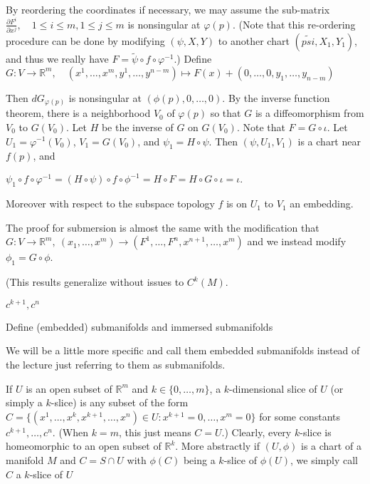 By reordering the coordinates if necessary, we may assume the sub-matrix
\(\frac{\partial F^i}{\partial x^j}, \quad 1 \leq i \leq m, 1 \leq j \leq m\)
is nonsingular at \(\varphi(p)\). (Note that this re-ordering procedure can be done by modifying \((\psi, X, Y)\) to another chart \((\tilde{psi}, X_1, Y_1)\), and thus we really have \(F = \tilde{\psi} \circ f \circ \varphi^{-1}\).) Define
\(G : V \to \mathbb{R}^m, \quad (x^1, \dots, x^m, y^1, \dots, y^{n-m}) \mapsto F(x) + (0, \dots, 0, y_1, \dots, y_{n-m})\)

Then \(dG_{\varphi(p)}\) is nonsingular at \( (\phi(p), 0, \dots, 0) \). By the inverse function theorem, there is a neighborhood \(V_0\) of \(\varphi(p)\) so that \(G\) is a diffeomorphism from \(V_0\) to \(G(V_0)\). Let \(H\) be the inverse of \(G\) on \(G(V_0)\). Note that \(F = G \circ \iota \). Let \(U_1 = \varphi^{-1}(V_0)\), \(V_1 = G(V_0)\), and \(\psi_1 = H \circ \psi \). Then \((\psi, U_1, V_1)\) is a chart near \(f(p)\), and

\(\psi_1 \circ f \circ \varphi^{-1} = (H\circ \psi) \circ f \circ \phi^{-1} = H \circ F = H \circ G \circ \iota = \iota.\)

Moreover with respect to the subspace topology \( f \) is on \( U_1 \) to \( V_1 \) an embedding.

The proof for submersion is almost the same with the modification that \( G : V \to \mathbb{R}^m,\ (x_1, \dots, x^m) \to (F^1, \dots, F^n, x^{n+1}, \dots, x^m) \)
and we instead modify \( \phi_1 = G \circ \phi \).

(This results generalize without issues to \( C^k(M) \).

\( c^{k+1}, c^n \)

Define (embedded) submanifolds and immersed submanifolds

We will be a little more specific and call them embedded submanifolds instead of the lecture just referring to them as submanifolds.

If \(U\) is an open subset of \(\mathbb{R}^m\) and \(k \in \{0, \dots, m\}\), a \(k\)-dimensional slice of \(U\) (or simply a \(k\)-slice) is any subset of the form 
\(C = \{(x^1, \dots, x^k, x^{k+1}, \dots, x^n) \in U : x^{k+1} = 0, \dots, x^m = 0\}\)
for some constants \(c^{k+1}, \dots, c^n\). (When \(k = m\), this just means \(C = U\).) Clearly, every \(k\)-slice is homeomorphic to an open subset of \(\mathbb{R}^k\). 
More abstractly if \( (U, \phi) \) is a chart of a manifold \( M \) and \( C = S \cap U \) with \( \phi(C) \) being a \( k \)-slice of \( \phi(U) \), we simply 
call \( C \) a \( k \)-slice of \( U \)


